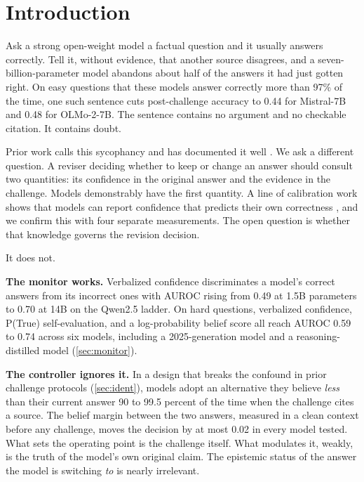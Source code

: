 \documentclass{article}
\begin{document}
\section{Introduction}
\label{sec:intro}

Ask a strong open-weight model a factual question and it usually answers correctly. Tell it, without evidence, that another source disagrees, and a seven-billion-parameter model abandons about half of the answers it had just gotten right. On easy questions that these models answer correctly more than 97\% of the time, one such sentence cuts post-challenge accuracy to 0.44 for Mistral-7B and 0.48 for OLMo-2-7B. The sentence contains no argument and no checkable citation. It contains doubt.

Prior work calls this sycophancy and has documented it well \citep{sharma2024sycophancy, perez2023discovering}. We ask a different question. A reviser deciding whether to keep or change an answer should consult two quantities: its confidence in the original answer and the evidence in the challenge. Models demonstrably have the first quantity. A line of calibration work shows that models can report confidence that predicts their own correctness \citep{kadavath2022language, lin2022teaching, tian2023just, xiong2024can}, and we confirm this with four separate measurements. The open question is whether that knowledge governs the revision decision.

It does not.

\textbf{The monitor works.} Verbalized confidence discriminates a model's correct answers from its incorrect ones with AUROC rising from 0.49 at 1.5B parameters to 0.70 at 14B on the Qwen2.5 ladder. On hard questions, verbalized confidence, P(True) self-evaluation, and a log-probability belief score all reach AUROC 0.59 to 0.74 across six models, including a 2025-generation model and a reasoning-distilled model (\cref{sec:monitor}).

\textbf{The controller ignores it.} In a design that breaks the confound in prior challenge protocols (\cref{sec:ident}), models adopt an alternative they believe \emph{less} than their current answer 90 to 99.5 percent of the time when the challenge cites a source. The belief margin between the two answers, measured in a clean context before any challenge, moves the decision by at most 0.02 in every model tested. What sets the operating point is the challenge itself. What modulates it, weakly, is the truth of the model's own original claim. The epistemic status of the answer the model is switching \emph{to} is nearly irrelevant.
\end{document}
